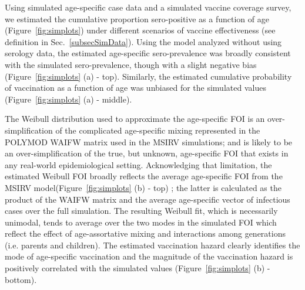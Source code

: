 \documentclass[nofootinbib,aps,pre,twocolumn,superscriptaddress,showkeys,showpacs]{revtex4-1}
\begin{document}
Using simulated age-specific case data and a simulated vaccine coverage survey, we estimated the cumulative proportion sero-positive as a function of age (Figure~\ref{fig:simplots}) under different scenarios of vaccine effectiveness (see definition in Sec.~\ref{subsecSimData}).  Using the model analyzed without using serology data, the estimated age-specific sero-prevalence was broadly consistent with the simulated sero-prevalence, though with a slight negative bias (Figure~\ref{fig:simplots} (a) - top). Similarly, the estimated cumulative probability of vaccination as a function of age was unbiased for the simulated values (Figure~\ref{fig:simplots} (a) - middle).

The Weibull distribution used to approximate the age-specific FOI is an over-simplification of the complicated age-specific mixing represented in the POLYMOD WAIFW matrix used in the MSIRV simulations; and is likely to be an over-simplification of the true, but unknown, age-specific FOI that exists in any real-world epidemiological setting.  Acknowledging that limitation, the estimated Weibull FOI broadly reflects the average age-specific FOI from the MSIRV model(Figure~\ref{fig:simplots} (b) - top) ; the latter is calculated as the product of the WAIFW matrix and the average age-specific vector of infectious cases over the full simulation.  The resulting Weibull fit, which is necessarily unimodal, tends to average over the two modes in the simulated FOI which reflect the effect of age-assortative mixing and interactions among generations (i.e. parents and children).  The estimated vaccination hazard clearly identifies the mode of age-specific vaccination and the magnitude of the vaccination hazard is positively correlated with the simulated values (Figure~\ref{fig:simplots} (b) - bottom). 
\end{document}
